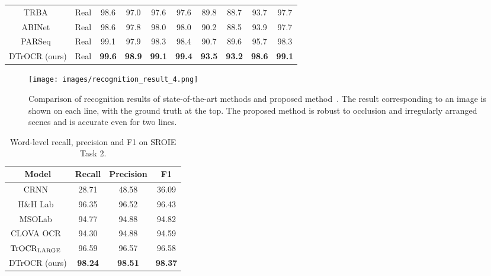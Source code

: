 \documentclass[10pt,twocolumn,letterpaper]{article}
\begin{document}
\begin{table*}[tb]
\begin{tabular}{cccccccccc}
TRBA~\cite{baek2021TRBA, bautista2022parseq} & Real &98.6 & 97.0 & 97.6 & 97.6 & 89.8 & 88.7 & 93.7 & 97.7 \\
ABINet~\cite{fang2021ABINet, bautista2022parseq} & Real & 98.6 & 97.8 & 98.0 & 98.0 & 90.2 & 88.5 & 93.9 & 97.7 \\

PARSeq~\cite{bautista2022parseq} & Real& 99.1 & 97.9 & 98.3 & 98.4 & 90.7 & 89.6 & 95.7 & 98.3 \\
DTrOCR (ours) & Real & \textbf{99.6} & \textbf{98.9} & \textbf{99.1} & \textbf{99.4} & \textbf{93.5} & \textbf{93.2} & \textbf{98.6} & \textbf{99.1} \\


\bottomrule

\end{tabular}
\end{table*}

\begin{figure}[htp]
	\centering
	\texttt{[image: images/recognition\_result\_4.png]}
	\caption{
Comparison of recognition results of state-of-the-art methods and proposed method~\cite{fang2021ABINet, bautista2022parseq}.
The result corresponding to an image is shown on each line, with the ground truth at the top.
The proposed method is robust to occlusion and irregularly arranged scenes and is accurate even for two lines.
}
	\label{fig:recognition_result}
\end{figure}


\begin{table}[ht]
\centering
\caption{Word-level recall, precision and F1 on SROIE Task 2.
}
\label{tab:method_overall_result_sroie}
\begin{tabular}{cccc}
\toprule
Model & Recall & Precision & F1 \\ \midrule
CRNN~\cite{shi2016crnn}            & 28.71              & 48.58          & 36.09         \\
H\&H Lab~\cite{huang2019sroie} & 96.35           & 96.52              & 96.43       \\
MSOLab~\cite{huang2019sroie}   & 94.77           & 94.88              & 94.82       \\
CLOVA OCR~\cite{huang2019sroie} & 94.30            & 94.88              & 94.59       \\
$\textrm{TrOCR}_{\rm LARGE}$~\cite{li2021trocr}     & 96.59           & 96.57              & 96.58       \\
\hline
DTrOCR (ours) & \textbf{98.24}            & \textbf{98.51}              & \textbf{98.37}       \\
\bottomrule
\end{tabular}
\end{table}
\end{document}

